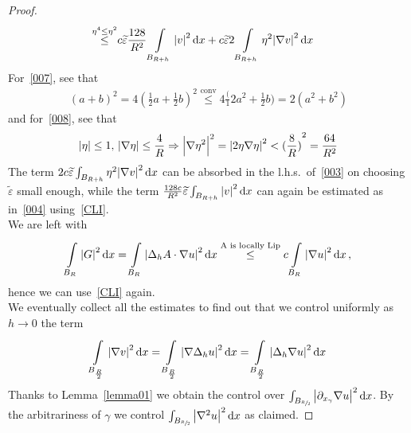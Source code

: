 \begin{proof}
\begin{align}
		\overset{\eta ^{4}\leq \eta ^{2}}{\leq}                                                                                                    & c \widetilde{\varepsilon } \frac{128}{R^{2}} \int\limits_{B_{R+h}}^{} \abs{v}^{2} \dd{x} + c \widetilde{\varepsilon } 2 \int\limits_{B_{R+h}}^{} \eta ^{2}\abs{\nabla v}^{2} \dd{x}
	\end{align}
	For~\eqref{007}, see that
	\begin{gather}
		{(a+b)}^{2}= 4{(\frac{1}{2}a+\frac{1}{2}b)} ^{2} \overset{\text{conv}}{\leq } 4 \frac( {1}{2}a^{2}+ \frac{1}{2}b) = 2(a^{2}+b^{2}) \label{007}
	\end{gather}
	and for~\eqref{008}, see that
	\begin{gather}
		\abs{\eta }\leq 1, \, \abs{\nabla \eta }\leq \frac{4}{R} \Rightarrow \abs{\nabla \eta ^{2}}^{2}=\abs{2 \eta \nabla \eta }^{2} < {(\frac{8}{R})} ^{2} = \frac{64}{R^{2}} \label{008}
	\end{gather}
	The term \( 2 c \widetilde{\varepsilon } \int_{B_{R+h}}^{} \eta ^{2} \abs{\nabla v}^{2} \dd{x} \) can be absorbed in the l.h.s.\ of~\eqref{003} on choosing \( \widetilde{\varepsilon } \) small enough, while the term \( \frac{128c}{R^{2}} \widetilde{\varepsilon } \int_{B_{R+h}}^{} \abs{v}^{2} \dd{x} \) can again be estimated as in~\eqref{004} using~\eqref{CLI}. \\
	We are left with
	\begin{gather}
		\int\limits_{B_{R}}^{} \abs{G}^{2} \dd{x} = \int\limits_{B_{R}}^{} \abs{\Delta_{h}A \cdot \nabla u}^{2} \dd{x} \overset{\text{A is locally Lip}}{\leq } c \int\limits_{B_{R}}^{} \abs{\nabla u}^{2} \dd{x}, \label{006}
	\end{gather}
	hence we can use~\eqref{CLI} again. \\
	We eventually collect all the estimates to find out that we control uniformly as \( h \to 0 \) the term
	\begin{gather}
		\int\limits_{B_{\frac{R}{2}}}^{} \abs{\nabla v}^{2} \dd{x}	= \int\limits_{B_{\frac{R}{2}}}^{} \abs{\nabla \Delta _{h}u}^{2} \dd{x}	= \int\limits_{B_{\frac{R}{2}}}^{} \abs{\Delta _{h} \nabla u}^{2} \dd{x}
	\end{gather}
	Thanks to Lemma~\ref{lemma01} we obtain the control over \( \int_{B_{\sfrac{R}{2}}}^{} \abs{\partial_{x_{\gamma }}	\nabla u}^{2} \dd{x} \). By the arbitrariness of \( \gamma \) we control \( \int_{B_{\sfrac{R}{2}}}^{} \abs{\nabla ^{2}u}^{2} \dd{x} \) as claimed.
\end{proof}